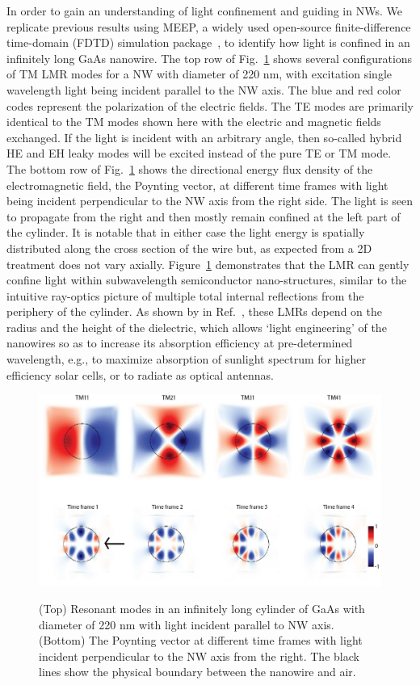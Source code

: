 In order to gain an understanding of light confinement and guiding in NWs. We
replicate previous results using MEEP, a widely used open-source
finite-difference time-domain (FDTD) simulation package~\cite{Oskooi:2010fb},
to identify how light is confined in an infinitely long GaAs nanowire. The top
row of Fig.~\ref{CylindEz} shows several configurations of TM LMR modes for a
NW with diameter of 220 nm, with excitation single wavelength light being
incident parallel to the NW axis. The blue and red color codes represent the
polarization of the electric fields. The TE modes are primarily identical to
the TM modes shown here with the electric and magnetic fields exchanged. If the
light is incident with an arbitrary angle, then so-called hybrid HE and EH
leaky modes will be excited instead of the pure TE or TM mode. The bottom row
of Fig.~\ref{CylindEz} shows the directional energy flux density of the
electromagnetic field, the Poynting vector, at different time frames with light
being incident perpendicular to the NW axis from the right side. The light is
seen to propagate from the right and then mostly remain confined at the left
part of the cylinder. It is notable that in either case the light energy is
spatially distributed along the cross section of the wire but, as expected from
a 2D treatment does not vary axially. Figure~\ref{CylindEz} demonstrates that
the LMR can gently confine light within subwavelength semiconductor
nano-structures, similar to the intuitive ray-optics picture of multiple total
internal reflections from the periphery of the cylinder. As shown by in
Ref.~\cite{Cao:2009ho}, these LMRs depend on the radius and the height of the
dielectric, which allows ‘light engineering’ of the nanowires so as to increase
its absorption efficiency at pre-determined wavelength, e.g., to maximize
absorption of sunlight spectrum for higher efficiency solar cells, or to
radiate as optical antennas.

\begin{figure}
  \caption{(Top) Resonant modes in an infinitely long cylinder of GaAs with diameter of 220 nm with light incident parallel to NW axis. (Bottom) The Poynting vector at different time frames with light incident perpendicular to the NW axis from the right. The black lines show the physical boundary between the nanowire and air.}
  \centering
  \includegraphics[width=\textwidth]{pictures/LM/CylindEz}
  \label{CylindEz}
\end{figure}

